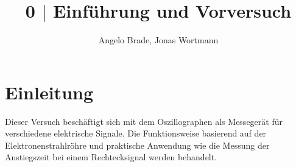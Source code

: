 \documentclass[a4paper,12pt]{article}
\numberwithin{equation}{section}
\begin{document}

\title{0 $|$ Einführung und Vorversuch}
\author{Angelo Brade, Jonas Wortmann}
\maketitle
{}


\newpage


\fancyhead[L]{\thepage}
\fancyfoot[C]{}

\tableofcontents


\newpage


\fancyhead[R]{\leftmark}

\newpage
\section{Einleitung}
Dieser Versuch beschäftigt sich mit dem Oszillographen als Messegerät für verschiedene elektrische Signale.
Die Funktionsweise basierend auf der Elektronenstrahlröhre und praktische Anwendung wie die Messung der Anstiegszeit bei einem Rechtecksignal werden behandelt.

\newpage
\end{document}
